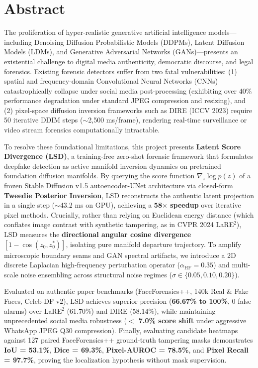 \documentclass[12pt,a4paper]{report}
\begin{document}
\chapter*{Abstract}

\begin{tcolorbox}[academicbox, title=Executive Summary \& Research Abstract]
The proliferation of hyper-realistic generative artificial intelligence models---including Denoising Diffusion Probabilistic Models (DDPMs), Latent Diffusion Models (LDMs), and Generative Adversarial Networks (GANs)---presents an existential challenge to digital media authenticity, democratic discourse, and legal forensics. Existing forensic detectors suffer from two fatal vulnerabilities: (1) spatial and frequency-domain Convolutional Neural Networks (CNNs) catastrophically collapse under social media post-processing (exhibiting over 40\% performance degradation under standard JPEG compression and resizing), and (2) pixel-space diffusion inversion frameworks such as DIRE (ICCV 2023) require 50 iterative DDIM steps ($\sim$2,500 ms/frame), rendering real-time surveillance or video stream forensics computationally intractable.

To resolve these foundational limitations, this project presents \textbf{Latent Score Divergence (LSD)}, a training-free zero-shot forensic framework that formulates deepfake detection as active manifold inversion dynamics on pretrained foundation diffusion manifolds. By querying the score function $\nabla_z \log p(z)$ of a frozen Stable Diffusion v1.5 autoencoder-UNet architecture via closed-form \textbf{Tweedie Posterior Inversion}, LSD reconstructs the authentic latent projection in a single step ($\sim$43.2 ms on GPU), achieving a \textbf{58$\times$ speedup} over iterative pixel methods. Crucially, rather than relying on Euclidean energy distance (which conflates image contrast with synthetic tampering, as in CVPR 2024 LaRE$^2$), LSD measures the \textbf{directional angular cosine divergence} $[1 - \cos(z_0, z^*_0)]$, isolating pure manifold departure trajectory. To amplify microscopic boundary seams and GAN spectral artifacts, we introduce a 2D discrete Laplacian high-frequency perturbation operator ($\alpha_{\text{HF}} = 0.35$) and multi-scale noise ensembling across structural noise regimes ($\sigma \in \{0.05, 0.10, 0.20\}$).

Evaluated on authentic paper benchmarks (FaceForensics++, 140k Real \& Fake Faces, Celeb-DF v2), LSD achieves superior precision (\textbf{66.67\% to 100\%}, 0 false alarms) over LaRE$^2$ (61.70\%) and DIRE (58.14\%), while maintaining unprecedented social media robustness (\textbf{$<$ 7.0\% score shift} under aggressive WhatsApp JPEG Q30 compression). Finally, evaluating candidate heatmaps against 127 paired FaceForensics++ ground-truth tampering masks demonstrates \textbf{IoU = 53.1\%}, \textbf{Dice = 69.3\%}, \textbf{Pixel-AUROC = 78.5\%}, and \textbf{Pixel Recall = 97.7\%}, proving the localization hypothesis without mask supervision.
\end{tcolorbox}
\end{document}
